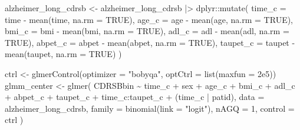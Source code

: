 \documentclass[
  9pt,
  letterpaper,
  DIV=11,
  numbers=noendperiod]{scrartcl}
\newenvironment{Shaded}{\begin{snugshade}}{\end{snugshade}}
\newcommand{\AttributeTok}[1]{\textcolor[rgb]{0.40,0.45,0.13}{#1}}
\newcommand{\ConstantTok}[1]{\textcolor[rgb]{0.56,0.35,0.01}{#1}}
\newcommand{\DecValTok}[1]{\textcolor[rgb]{0.68,0.00,0.00}{#1}}
\newcommand{\FloatTok}[1]{\textcolor[rgb]{0.68,0.00,0.00}{#1}}
\newcommand{\FunctionTok}[1]{\textcolor[rgb]{0.28,0.35,0.67}{#1}}
\newcommand{\NormalTok}[1]{\textcolor[rgb]{0.00,0.23,0.31}{#1}}
\newcommand{\OtherTok}[1]{\textcolor[rgb]{0.00,0.23,0.31}{#1}}
\newcommand{\SpecialCharTok}[1]{\textcolor[rgb]{0.37,0.37,0.37}{#1}}
\newcommand{\StringTok}[1]{\textcolor[rgb]{0.13,0.47,0.30}{#1}}
\begin{document}
\begin{Shaded}
\begin{Highlighting}[]
\NormalTok{alzheimer\_long\_cdrsb }\OtherTok{\textless{}{-}}\NormalTok{ alzheimer\_long\_cdrsb }\SpecialCharTok{|\textgreater{}}
\NormalTok{  dplyr}\SpecialCharTok{::}\FunctionTok{mutate}\NormalTok{(}
    \AttributeTok{time\_c   =}\NormalTok{ time   }\SpecialCharTok{{-}} \FunctionTok{mean}\NormalTok{(time,   }\AttributeTok{na.rm =} \ConstantTok{TRUE}\NormalTok{),}
    \AttributeTok{age\_c    =}\NormalTok{ age    }\SpecialCharTok{{-}} \FunctionTok{mean}\NormalTok{(age,    }\AttributeTok{na.rm =} \ConstantTok{TRUE}\NormalTok{),}
    \AttributeTok{bmi\_c    =}\NormalTok{ bmi    }\SpecialCharTok{{-}} \FunctionTok{mean}\NormalTok{(bmi,    }\AttributeTok{na.rm =} \ConstantTok{TRUE}\NormalTok{),}
    \AttributeTok{adl\_c    =}\NormalTok{ adl    }\SpecialCharTok{{-}} \FunctionTok{mean}\NormalTok{(adl,    }\AttributeTok{na.rm =} \ConstantTok{TRUE}\NormalTok{),}
    \AttributeTok{abpet\_c  =}\NormalTok{ abpet  }\SpecialCharTok{{-}} \FunctionTok{mean}\NormalTok{(abpet,  }\AttributeTok{na.rm =} \ConstantTok{TRUE}\NormalTok{),}
    \AttributeTok{taupet\_c =}\NormalTok{ taupet }\SpecialCharTok{{-}} \FunctionTok{mean}\NormalTok{(taupet, }\AttributeTok{na.rm =} \ConstantTok{TRUE}\NormalTok{)}
\NormalTok{  )}

\NormalTok{ctrl }\OtherTok{\textless{}{-}} \FunctionTok{glmerControl}\NormalTok{(}\AttributeTok{optimizer =} \StringTok{"bobyqa"}\NormalTok{, }\AttributeTok{optCtrl =} \FunctionTok{list}\NormalTok{(}\AttributeTok{maxfun =} \FloatTok{2e5}\NormalTok{))}
\NormalTok{glmm\_center }\OtherTok{\textless{}{-}} \FunctionTok{glmer}\NormalTok{(}
\NormalTok{  CDRSBbin }\SpecialCharTok{\textasciitilde{}}\NormalTok{ time\_c }\SpecialCharTok{+}\NormalTok{ sex }\SpecialCharTok{+}\NormalTok{ age\_c }\SpecialCharTok{+}\NormalTok{ bmi\_c }\SpecialCharTok{+}\NormalTok{ adl\_c }\SpecialCharTok{+}
\NormalTok{    abpet\_c }\SpecialCharTok{+}\NormalTok{ taupet\_c }\SpecialCharTok{+}\NormalTok{ time\_c}\SpecialCharTok{:}\NormalTok{taupet\_c }\SpecialCharTok{+}
\NormalTok{    (time\_c }\SpecialCharTok{|}\NormalTok{ patid),}
  \AttributeTok{data   =}\NormalTok{ alzheimer\_long\_cdrsb,}
  \AttributeTok{family =} \FunctionTok{binomial}\NormalTok{(}\AttributeTok{link =} \StringTok{"logit"}\NormalTok{),}
  \AttributeTok{nAGQ   =} \DecValTok{1}\NormalTok{,}
  \AttributeTok{control =}\NormalTok{ ctrl}
\NormalTok{)}
\end{Highlighting}
\end{Shaded}
\end{document}
